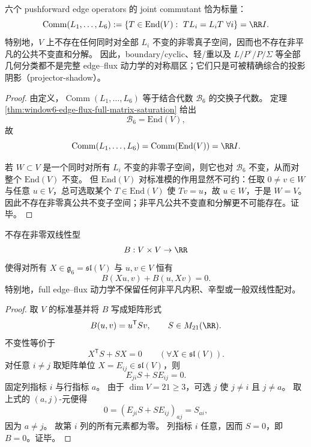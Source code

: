 \begin{theorem}\label{thm:window6-edge-flux-commutant-rigidity}
六个 pushforward edge operators 的 joint commutant 恰为标量：
\[
\operatorname{Comm}(L_1,\dots,L_6)
:=
\{T\in \mathrm{End}(V):\ TL_i=L_iT\ \forall i\}
=\RR I.
\]
特别地，\(V\) 上不存在任何同时对全部 \(L_i\) 不变的非零真子空间，因而也不存在非平凡的公共不变直和分解。
因此，boundary/cyclic、轻/重以及 \(L/P^\circ/P/\Sigma\) 等全部几何分类都不是完整 edge--flux 动力学的对称扇区；它们只是可被精确综合的投影阴影（projector-shadow）。
\end{theorem}
\begin{proof}
由定义，\(\operatorname{Comm}(L_1,\dots,L_6)\) 等于结合代数 \(\mathcal B_6\) 的交换子代数。
定理 \ref{thm:window6-edge-flux-full-matrix-saturation} 给出
\[
\mathcal B_6=\mathrm{End}(V),
\]
故
\[
\operatorname{Comm}(L_1,\dots,L_6)=\operatorname{Comm}(\mathrm{End}(V))=\RR I.
\]

若 \(W\subset V\) 是一个同时对所有 \(L_i\) 不变的非零子空间，则它也对 \(\mathcal B_6\) 不变，从而对整个 \(\mathrm{End}(V)\) 不变。
但 \(\mathrm{End}(V)\) 对标准模的作用显然不可约：任取 \(0\neq v\in W\) 与任意 \(u\in V\)，总可选取某个 \(T\in \mathrm{End}(V)\) 使 \(Tv=u\)，故 \(u\in W\)，于是 \(W=V\)。
因此不存在非零真公共不变子空间；非平凡公共不变直和分解更不可能存在。证毕。
\end{proof}


\begin{proposition}\label{prop:window6-edge-flux-no-invariant-bilinear-form}
不存在非零双线性型
\[
B:V\times V\to \RR
\]
使得对所有 \(X\in \mathfrak g_6=\mathfrak{sl}(V)\) 与 \(u,v\in V\) 恒有
\[
B(Xu,v)+B(u,Xv)=0.
\]
特别地，full edge--flux 动力学不保留任何非平凡内积、辛型或一般双线性配对。
\end{proposition}
\begin{proof}
取 \(V\) 的标准基并将 \(B\) 写成矩阵形式
\[
B(u,v)=u^{\mathsf T}Sv,\qquad S\in M_{21}(\RR).
\]
不变性等价于
\[
X^{\mathsf T}S+SX=0\qquad(\forall X\in \mathfrak{sl}(V)).
\]
对任意 \(i\neq j\) 取矩阵单位 \(X=E_{ij}\in \mathfrak{sl}(V)\)，则
\[
E_{ji}S+SE_{ij}=0.
\]
固定列指标 \(i\) 与行指标 \(a\)。
由于 \(\dim V=21\ge 3\)，可选 \(j\) 使 \(j\neq i\) 且 \(j\neq a\)。
取上式的 \((a,j)\)-元便得
\[
0=(E_{ji}S+SE_{ij})_{aj}=S_{ai},
\]
因为 \(a\neq j\)。
故第 \(i\) 列的所有元素都为零。
列指标 \(i\) 任意，因而 \(S=0\)，即 \(B=0\)。证毕。
\end{proof}

